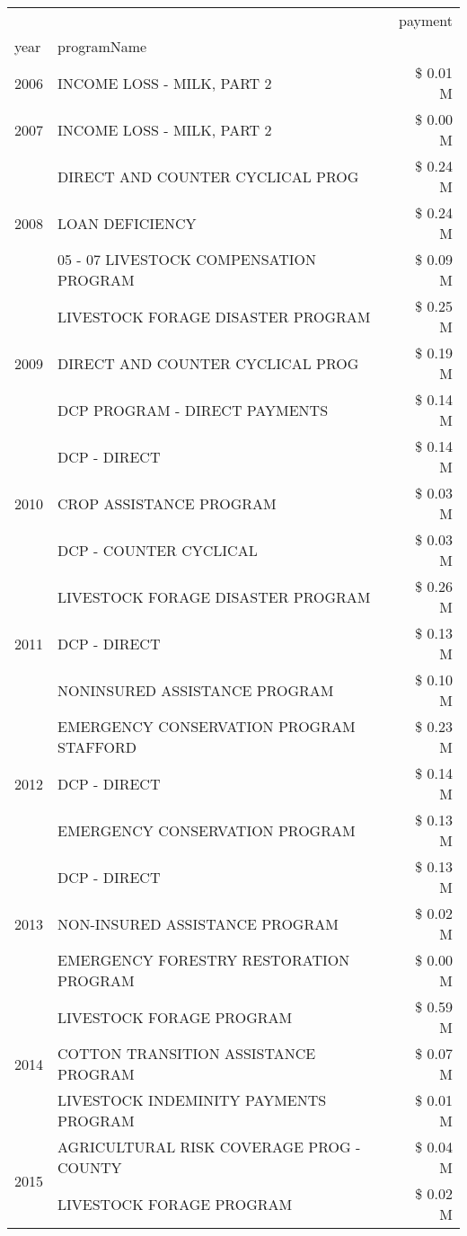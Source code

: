\begin{tabular}{llr}
\toprule
 &  & payment \\
year & programName &  \\
\midrule
2006 & INCOME LOSS - MILK, PART 2 & \$ 0.01 M \\
\cline{1-3}
2007 & INCOME LOSS - MILK, PART 2 & \$ 0.00 M \\
\cline{1-3}
\multirow[t]{3}{*}{2008} & DIRECT AND COUNTER CYCLICAL PROG & \$ 0.24 M \\
 & LOAN DEFICIENCY & \$ 0.24 M \\
 & 05 - 07 LIVESTOCK COMPENSATION PROGRAM & \$ 0.09 M \\
\cline{1-3}
\multirow[t]{3}{*}{2009} & LIVESTOCK FORAGE DISASTER  PROGRAM & \$ 0.25 M \\
 & DIRECT AND COUNTER CYCLICAL PROG & \$ 0.19 M \\
 & DCP PROGRAM - DIRECT PAYMENTS & \$ 0.14 M \\
\cline{1-3}
\multirow[t]{3}{*}{2010} & DCP - DIRECT & \$ 0.14 M \\
 & CROP ASSISTANCE PROGRAM & \$ 0.03 M \\
 & DCP - COUNTER CYCLICAL & \$ 0.03 M \\
\cline{1-3}
\multirow[t]{3}{*}{2011} & LIVESTOCK FORAGE DISASTER PROGRAM & \$ 0.26 M \\
 & DCP - DIRECT & \$ 0.13 M \\
 & NONINSURED ASSISTANCE PROGRAM & \$ 0.10 M \\
\cline{1-3}
\multirow[t]{3}{*}{2012} & EMERGENCY CONSERVATION PROGRAM STAFFORD & \$ 0.23 M \\
 & DCP - DIRECT & \$ 0.14 M \\
 & EMERGENCY CONSERVATION PROGRAM & \$ 0.13 M \\
\cline{1-3}
\multirow[t]{3}{*}{2013} & DCP - DIRECT & \$ 0.13 M \\
 & NON-INSURED ASSISTANCE PROGRAM & \$ 0.02 M \\
 & EMERGENCY FORESTRY RESTORATION PROGRAM & \$ 0.00 M \\
\cline{1-3}
\multirow[t]{3}{*}{2014} & LIVESTOCK FORAGE PROGRAM & \$ 0.59 M \\
 & COTTON TRANSITION ASSISTANCE PROGRAM & \$ 0.07 M \\
 & LIVESTOCK INDEMINITY PAYMENTS PROGRAM & \$ 0.01 M \\
\cline{1-3}
\multirow[t]{3}{*}{2015} & AGRICULTURAL RISK COVERAGE PROG - COUNTY & \$ 0.04 M \\
 & LIVESTOCK FORAGE PROGRAM & \$ 0.02 M \\

\end{tabular}
